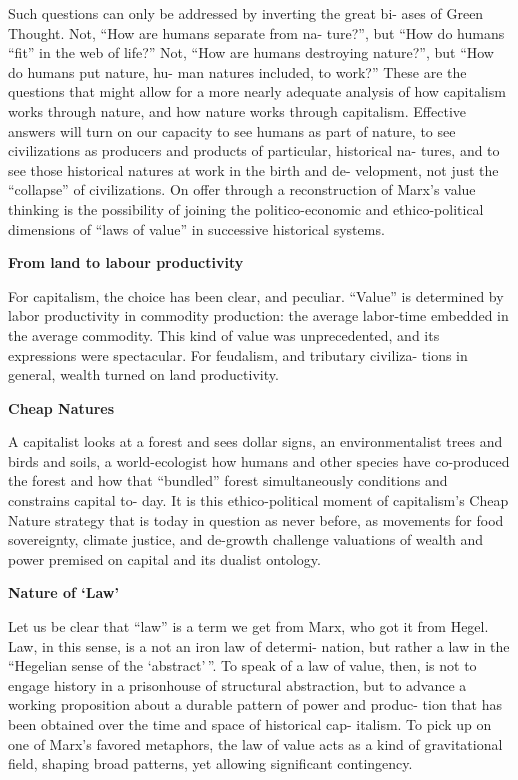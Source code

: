 \documentclass[
]{book}
\begin{document}
Such questions can only be addressed by inverting the great bi-
ases of Green Thought. Not, ``How are humans separate from na-
ture?'', but ``How do humans ``fit'' in the web of life?'' Not, ``How are
humans destroying nature?'', but ``How do humans put nature, hu-
man natures included, to work?'' These are the questions that might
allow for a more nearly adequate analysis of how capitalism works
through nature, and how nature works through capitalism. Effective
answers will turn on our capacity to see humans as part of nature, to
see civilizations as producers and products of particular, historical na-
tures, and to see those historical natures at work in the birth and de-
velopment, not just the ``collapse'' of civilizations. On offer through a
reconstruction of Marx's value thinking is the possibility of joining
the politico-economic and ethico-political dimensions of ``laws of
value'' in successive historical systems.

\textbf{From land to labour productivity}

For capitalism, the choice has
been clear, and peculiar. ``Value'' is determined by labor productivity
in commodity production: the average labor-time embedded in the
average commodity. This kind of value was unprecedented, and its
expressions were spectacular. For feudalism, and tributary civiliza-
tions in general, wealth turned on land productivity.

\textbf{Cheap Natures}

A capitalist looks at a forest and sees dollar signs,
an environmentalist trees and birds and soils, a world-ecologist how
humans and other species have co-produced the forest and how that
``bundled'' forest simultaneously conditions and constrains capital to-
day. It is this ethico-political moment of capitalism's Cheap Nature
strategy that is today in question as never before, as movements for
food sovereignty, climate justice, and de-growth challenge valuations
of wealth and power premised on capital and its dualist ontology.

\textbf{Nature of `Law'}

Let us be clear that ``law'' is a term we get from Marx, who
got it from Hegel. Law, in this sense, is a not an iron law of determi-
nation, but rather a law in the ``Hegelian sense of the `abstract'\,''.
To speak of a law of value, then, is not to engage
history in a prisonhouse of structural abstraction, but to advance a
working proposition about a durable pattern of power and produc-
tion that has been obtained over the time and space of historical cap-
italism. To pick up on one of Marx's favored metaphors, the law of
value acts as a kind of gravitational field, shaping broad patterns, yet
allowing significant contingency.
\end{document}
